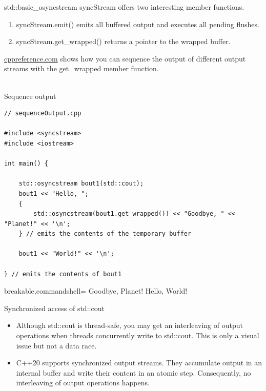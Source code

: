 std::basic\_osyncstream syncStream offers two interesting member functions.

\begin{enumerate}
\item 
syncStream.emit() emits all buffered output and executes all pending flushes.

\item 
syncStream.get\_wrapped() returns a pointer to the wrapped buffer.
\end{enumerate}

\href{https://en.cppreference.com/w/cpp/io/basic_osyncstream/get_wrapped}{cppreference.com} shows how you can sequence the output of different output streams with the get\_wrapped member function.

\hspace*{\fill} \\ %
\noindent
Sequence output
\begin{lstlisting}[style=styleCXX]
// sequenceOutput.cpp

#include <syncstream>
#include <iostream>

int main() {
	
	std::osyncstream bout1(std::cout);
	bout1 << "Hello, ";
	{
		std::osyncstream(bout1.get_wrapped()) << "Goodbye, " << "Planet!" << '\n';
	} // emits the contents of the temporary buffer

	bout1 << "World!" << '\n';
	
} // emits the contents of bout1
\end{lstlisting}

\begin{tcblisting}{breakable,commandshell={}}
Goodbye, Planet!
Hello, World!
\end{tcblisting}

\begin{center}
Synchronized access of std::cout
\end{center}

\begin{tcolorbox}[breakable,enhanced jigsaw,colback=mygreen!5!white,colframe=mygreen!75!black,title={Distilled Information}]
	
\begin{itemize}
\item 
Although std::cout is thread-safe, you may get an interleaving of output operations when threads concurrently write to std::cout. This is only a visual issue but not a data race.

\item 
C++20 supports synchronized output streams. They accumulate output in an internal buffer and write their content in an atomic step. Consequently, no interleaving of output operations happens.
\end{itemize}
	
\end{tcolorbox}



